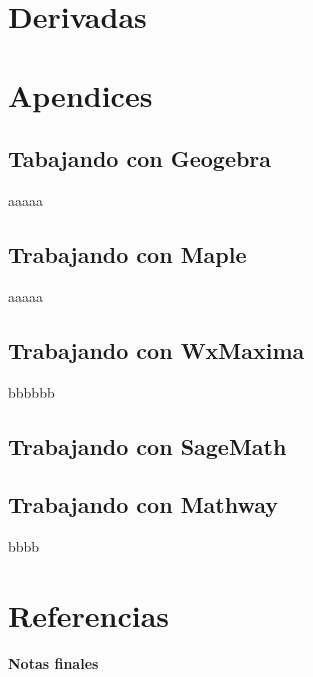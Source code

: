 \documentclass[english,spanish,2m,twoside,svgnames,x11names,HTML,twoside,12pt]{libro-matua}\usepackage[]{graphicx}\usepackage[]{color}
\providecommand\phantomsection{}
\begin{document}
\stopcontents[chapters]



\stopcontents[chapters]



\part{Derivadas}

\stopcontents[chapters]



\stopcontents[chapters]



\part{Apendices}
\appendix
\clearpage 
\phantomsection 
\chapter{Tabajando con Geogebra }
aaaaa
\phantomsection 
\chapter{Trabajando con Maple}
aaaaa
\clearpage 
\phantomsection 
\chapter{Trabajando con WxMaxima}
bbbbbb
\chapter{Trabajando con SageMath}
\chapter{Trabajando con Mathway}
bbbb
\part*{Referencias}






 

 \renewcommand{\indexname}{\'Indice}
  \phantomsection
\printindex

{\bf \Huge Notas finales}
\end{document}
